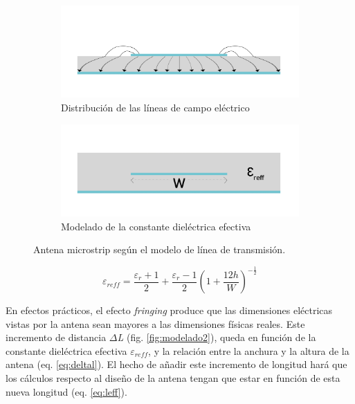 \begin{figure}[h]
     \centering
     \begin{subfigure}[b]{0.7\textwidth}
         \centering
         \includegraphics[width=\textwidth]{archivos/parche/Fringing}
         \caption{Distribución de las líneas de campo eléctrico}
         \label{fig:fringing}
     \end{subfigure}
     \hfill
     \begin{subfigure}[b]{0.7\textwidth}
         \centering
         \includegraphics[width=\textwidth]{archivos/parche/ereff}
         \caption{Modelado de la constante dieléctrica efectiva}
         \label{fig:ereff}
     \end{subfigure}
     \hfill
        \caption{Antena microstrip según el modelo de línea de transmisión.}
        \label{fig:modelado}
\end{figure}

\begin{equation}
	\varepsilon _{reff}=\frac{\varepsilon _{r}+1}{2}+\frac{\varepsilon _{r}-1}{2}\left ( 1+\frac{12h}{W} \right )^{-\frac{1}{2}}
	\label{eq:ereff}
\end{equation}

\par En efectos prácticos, el efecto \textit{fringing} produce que las dimensiones eléctricas vistas por la antena sean mayores a las dimensiones físicas reales. Este incremento de distancia \textit{$\Delta$L} (fig. \ref{fig:modelado2}), queda en función de la constante dieléctrica efectiva $\varepsilon_{reff}$, y la relación entre la anchura y la altura de la antena (eq. \ref{eq:deltal}). El hecho de añadir este incremento de longitud hará que los cálculos respecto al diseño de la antena tengan que estar en función de esta nueva longitud (eq. \ref{eq:leff}).

